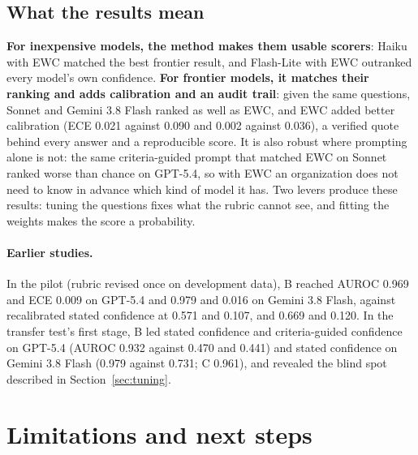 \documentclass[10pt,letterpaper]{article}
\begin{document}
\subsection{What the results mean}

\textbf{For inexpensive models, the method makes them usable scorers}: Haiku with EWC matched the best frontier result, and Flash-Lite with EWC outranked every model's own confidence. \textbf{For frontier models, it matches their ranking and adds calibration and an audit trail}: given the same questions, Sonnet and Gemini 3.8 Flash ranked as well as EWC, and EWC added better calibration (ECE 0.021 against 0.090 and 0.002 against 0.036), a verified quote behind every answer and a reproducible score. It is also robust where prompting alone is not: the same criteria-guided prompt that matched EWC on Sonnet ranked worse than chance on GPT-5.4, so with EWC an organization does not need to know in advance which kind of model it has. Two levers produce these results: tuning the questions fixes what the rubric cannot see, and fitting the weights makes the score a probability.

\paragraph{Earlier studies.} In the pilot (rubric revised once on development data), B reached AUROC 0.969 and ECE 0.009 on GPT-5.4 and 0.979 and 0.016 on Gemini 3.8 Flash, against recalibrated stated confidence at 0.571 and 0.107, and 0.669 and 0.120. In the transfer test's first stage, B led stated confidence and criteria-guided confidence on GPT-5.4 (AUROC 0.932 against 0.470 and 0.441) and stated confidence on Gemini 3.8 Flash (0.979 against 0.731; C 0.961), and revealed the blind spot described in Section~\ref{sec:tuning}.

\section{Limitations and next steps}
\end{document}
